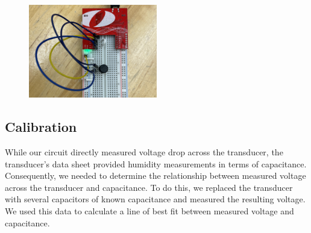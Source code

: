 \documentclass[11pt]{article}
\begin{document}
\begin{figure} [!ht]

	\centering  %
	
	\includegraphics[width=0.5\textwidth]{breadboard.jpg}
	
	
	\caption{}
	
	\label{fig:breadboard}
\end{figure}


\subsection{Calibration}

While our circuit directly measured voltage drop across the transducer, the transducer's data sheet provided humidity measurements in terms of capacitance. Consequently, we needed to determine the relationship between measured voltage across the transducer and capacitance. To do this, we replaced the transducer with several capacitors of known capacitance and measured the resulting voltage. We used this data to calculate a line of best fit between measured voltage and capacitance.
\end{document}
